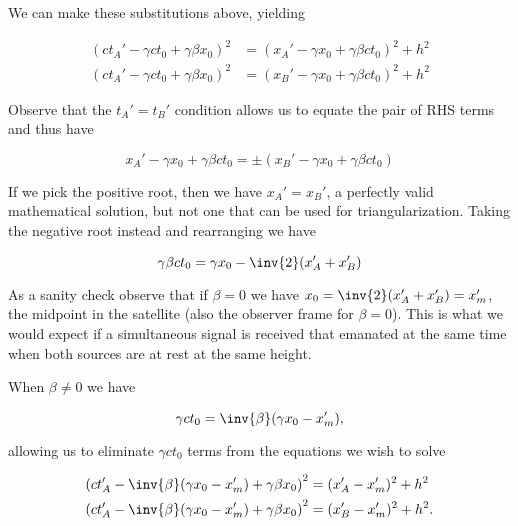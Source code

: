 {We can make these substitutions above, yielding

\begin{equation}\label{eqn:relElectroDynProblemSet1:1260}
\begin{aligned}
( c t_A' - \gamma c t_0 + \gamma \beta x_0)^2 &= (x_A' - \gamma x_0 + \gamma \beta c t_0 )^2 + h^2 \\
( c t_A' - \gamma c t_0 + \gamma \beta x_0)^2 &= (x_B' - \gamma x_0 + \gamma \beta c t_0 )^2 + h^2
\end{aligned}
\end{equation}

Observe that the $t_A' = t_B'$ condition allows us to equate the pair of RHS terms and thus have

\begin{equation}\label{eqn:relElectroDynProblemSet1:1280}
x_A' - \gamma x_0 + \gamma \beta c t_0 = \pm (x_B' - \gamma x_0 + \gamma \beta c t_0 )
\end{equation}

If we pick the positive root, then we have $x_A' = x_B'$, a perfectly valid mathematical solution, but not one that can be used for triangularization.  Taking the negative root instead and rearranging we have

\begin{equation}\label{eqn:relElectroDynProblemSet1:1301}
\gamma \beta c t_0 = \gamma x_0 - \inv{2}(x_A' + x_B')
\end{equation}

As a sanity check observe that if $\beta = 0$ we have $x_0 = \inv{2}(x_A' + x_B') = x_m'$, the midpoint in the satellite (also the observer frame for $\beta = 0$).  This is what we would expect if a simultaneous signal is received that emanated at the same time when both sources are at rest at the same height.

When $\beta \ne 0$ we have

\begin{equation}\label{eqn:relElectroDynProblemSet1:1302}
\gamma c t_0 = \inv{\beta}(\gamma x_0 - x_m'),
\end{equation}

allowing us to eliminate $\gamma c t_0$ terms from the equations we wish to solve

\begin{equation}\label{eqn:relElectroDynProblemSet1:1262}
\begin{aligned}
\left( c t_A' - \inv{\beta}( \gamma x_0 - x_m') + \gamma \beta x_0 \right)^2 &= (x_A' - x_m')^2 + h^2 \\
\left( c t_A' - \inv{\beta}( \gamma x_0 - x_m') + \gamma \beta x_0 \right)^2 &= (x_B' - x_m')^2 + h^2.
\end{aligned}
\end{equation}

}
